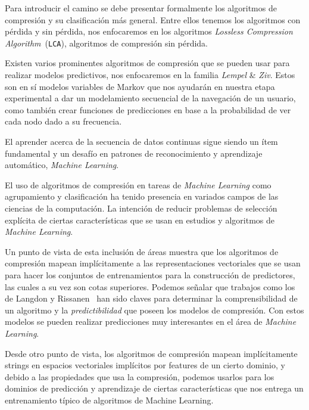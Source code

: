 Para introducir el camino se debe presentar formalmente los algoritmos de compresión y su clasificación más general. Entre ellos tenemos los algoritmos con pérdida y sin pérdida, nos enfocaremos en los algoritmos \emph{Lossless Compression Algorithm}~(\texttt{LCA}), algoritmos de compresión sin pérdida.

Existen varios prominentes algoritmos de compresión que se pueden usar para realizar modelos predictivos, nos enfocaremos en la familia \emph{Lempel} {\&} \emph{Ziv}. Estos son en sí modelos variables de Markov que nos ayudarán en nuestra etapa experimental a dar un modelamiento secuencial de la navegación de un usuario, como también crear funciones de predicciones en base a la probabilidad de ver cada nodo dado a su frecuencia.

El aprender acerca de la secuencia de datos continuas sigue siendo un ítem fundamental y un desafío en patrones de reconocimiento y aprendizaje automático, \emph{Machine Learning}.






El uso de algoritmos de compresión en tareas de \emph{Machine Learning} como agrupamiento y clasificación ha tenido presencia en variados campos de las ciencias de la computación. La intención de reducir problemas de selección explícita de ciertas características que se usan en estudios y algoritmos de \emph{Machine Learning}.


Un punto de vista de esta inclusión de áreas muestra que los algoritmos de compresión mapean implícitamente a las representaciones vectoriales que se usan para hacer los conjuntos de entrenamientos para la construcción de predictores, las cuales a su vez son cotas superiores. Podemos señalar que  trabajos como los de Langdon y Rissanen~\cite{RissanenLangdon1979} han sido claves para determinar la comprensibilidad de un algoritmo y la \emph{predictibilidad} que poseen los modelos de compresión. Con estos modelos se pueden realizar predicciones muy interesantes en el área de \emph{Machine Learning}.


Desde otro punto de vista, los algoritmos de compresión mapean implícitamente strings en espacios vectoriales implícitos por features de un cierto dominio, y debido a las propiedades que usa la  compresión, podemos usarlos para los dominios de predicción y aprendizaje de ciertas características que nos entrega un entrenamiento típico de algoritmos de Machine Learning.

